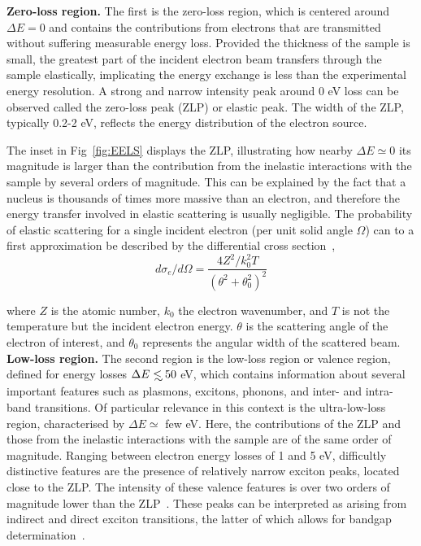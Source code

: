 {\bf Zero-loss region.} The first is the zero-loss region, which is centered around $\Delta E=0$
and contains the contributions from electrons that are transmitted without suffering
measurable energy loss.
%
Provided the thickness of the sample is small, the greatest part of the 
incident electron beam transfers through the sample elastically, 
implicating the energy exchange is less than the experimental energy resolution. 
%
A strong and narrow intensity peak around 0 eV loss can be observed called the zero-loss peak (ZLP) or elastic peak. 
The width of the ZLP, typically 0.2-2 eV, reflects the energy distribution of the electron source.

The inset in Fig~\ref{fig:EELS} displays the ZLP, illustrating how nearby $\Delta E\simeq 0$
its magnitude is larger than the contribution from the inelastic interactions
with the sample by several orders of magnitude.
%
This can be explained by the fact that a nucleus is thousands of times more massive than an electron, 
and therefore the energy transfer involved in elastic scattering is usually negligible. 
%
The probability of elastic scattering for a single incident electron 
(per unit solid angle $\Omega$) can to a first approximation be described by 
the differential cross section~\cite{Egerton:1996},
\begin{equation}
    d\sigma_e / d\Omega = \frac{4Z^2/k_0^2T}{(\theta^2 + \theta_0^2)^2}
\end{equation}

where $Z$ is the atomic number, $k_0$ the electron wavenumber, 
and $T$ is not the temperature but the incident electron energy. 
$\theta$ is the scattering angle of the electron of interest, 
and $\theta_0$ represents the angular width of the scattered beam. \\

{\bf Low-loss region.} The second region is the low-loss region or valence region, defined for energy losses
$\Delta E \lsim 50$ eV, which contains information
about several important features such as plasmons, excitons, phonons, and
inter- and intra-band transitions.
%
Of particular relevance in this context is the ultra-low-loss region, characterised by $\Delta E \simeq$ few eV.
Here, the contributions of the ZLP and those from the inelastic interactions
with the sample are of the same order of magnitude.
%
Ranging between electron energy losses of 1 and 5 eV, 
difficultly distinctive features are the presence of 
relatively narrow exciton peaks, located close to the ZLP. 
%
The intensity of these valence features is over two orders of magnitude lower 
than the ZLP~\cite{Abajo:2010}. These peaks can be interpreted as arising from
indirect and direct exciton transitions, the latter of which allows for
bandgap determination~\cite{Stoger:2008}.

